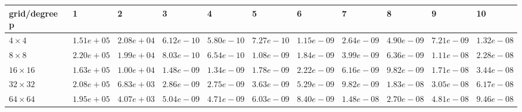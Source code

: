 \begin{tabular}{lllllllllll}
\hline
 grid/degree p   & 1          & 2          & 3          & 4          & 5          & 6          & 7          & 8          & 9          & 10         \\
\hline
 $4 \times 4$    & $1.51e+05$ & $2.08e+04$ & $6.12e-10$ & $5.80e-10$ & $7.27e-10$ & $1.15e-09$ & $2.64e-09$ & $4.90e-09$ & $7.21e-09$ & $1.32e-08$ \\
 $8 \times 8$    & $2.20e+05$ & $1.99e+04$ & $8.03e-10$ & $6.54e-10$ & $1.08e-09$ & $1.84e-09$ & $3.99e-09$ & $6.36e-09$ & $1.11e-08$ & $2.28e-08$ \\
 $16 \times 16$  & $1.63e+05$ & $1.00e+04$ & $1.48e-09$ & $1.34e-09$ & $1.78e-09$ & $2.22e-09$ & $6.16e-09$ & $9.82e-09$ & $1.71e-08$ & $3.44e-08$ \\
 $32 \times 32$  & $2.08e+05$ & $6.83e+03$ & $2.86e-09$ & $2.75e-09$ & $3.63e-09$ & $5.29e-09$ & $9.82e-09$ & $1.83e-08$ & $3.05e-08$ & $6.17e-08$ \\
 $64 \times 64$  & $1.95e+05$ & $4.07e+03$ & $5.04e-09$ & $4.71e-09$ & $6.03e-09$ & $8.40e-09$ & $1.48e-08$ & $2.70e-08$ & $4.81e-08$ & $9.46e-08$ \\
\hline
\end{tabular}